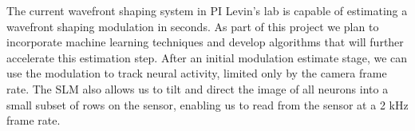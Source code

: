 

 
The current wavefront shaping system in PI Levin's lab is capable of estimating a wavefront shaping modulation in seconds. As part of this project we plan to incorporate machine learning techniques and develop algorithms that will further accelerate this estimation step.   After an initial modulation estimate stage, we can use the modulation to track neural activity, limited only by the camera frame rate. The SLM also allows us to tilt and direct the image of all neurons into a small subset of rows on the sensor, enabling us to read from the sensor at a 2 kHz frame rate.

